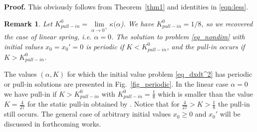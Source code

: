 \documentclass[review]{elsarticle}
\newcommand{\R}{{\mathbb R}}   %
\newtheorem{theorem}{Theorem}
\newtheorem{remark}[theorem]{Remark}
\newenvironment{proof}[1][Proof]{\textbf{#1.} }{\hfill \raisebox{-0.1em}{$\Box$}\\}
\begin{document}
\begin{proof}
This obviously follows from Theorem~\ref{thm1} and identities in \eqref{eqn:less}.
\end{proof}
\begin{remark}
Let $K^0_{pull-in}=\lim\limits_{\alpha\to 0^+} \kappa(\alpha$). We have
$K^0_{pull-in}= 1/8$, so we recovered the case of linear spring, i.e. $\alpha=0$. The solution to problem \eqref{eq_nondim} with initial values $x_0=x_0'=0$ is periodic if $K<K^0_{pull-in}$, and the pull-in occurs if $K>K^0_{pull-in}$.
\end{remark}
The values $(\alpha,K)$ for which the initial value problem \eqref{eq_dxdt^2} has periodic or pull-in solutions are presented in Fig.~\ref{fig_periodic}. In the linear case $\alpha=0$ we have pull-in if $K>K^0_{pull-in}$ with $K^0_{pull-in}=\frac{1}{8}$ which is smaller than the value $K=\frac{4}{27}$ for the static pull-in obtained by \cite{Younis}. Notice that for $\frac{4}{27}>K>\frac{1}{8}$ the pull-in still occurs. The general case of arbitrary initial values $x_0\ge 0$ and $x_0'$ will be discussed in forthcoming works.
\end{document}
